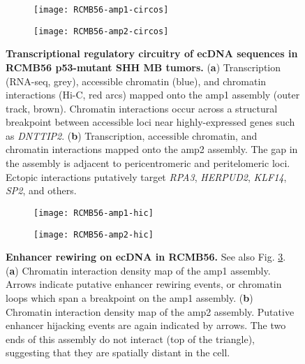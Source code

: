 \begin{figure}[!h]
    \centering
    \begin{subfigure}{.49\textwidth}
        \centering
        \texttt{[image: RCMB56-amp1-circos]}
        \caption{}
        \label{subfig:amp1-circos}
    \end{subfigure}
    \begin{subfigure}{.49\textwidth}
        \centering
        \texttt{[image: RCMB56-amp2-circos]}
        \caption{}
        \label{subfig:amp2-circos}
    \end{subfigure}
    \caption[Transcriptional regulatory circuitry of ecDNA sequences in RCMB56 p53-mutant SHH MB tumors.]{\textbf{Transcriptional regulatory circuitry of ecDNA sequences in RCMB56 p53-mutant SHH MB tumors.} (\textbf{a}) Transcription (RNA-seq, grey), accessible chromatin (blue), and chromatin interactions (Hi-C, red arcs) mapped onto the amp1 assembly (outer track, brown). Chromatin interactions occur across a structural breakpoint between accessible loci near highly-expressed genes such as \textit{DNTTIP2}. (\textbf{b}) Transcription, accessible chromatin, and chromatin interactions mapped onto the amp2 assembly. The gap in the assembly is adjacent to pericentromeric and peritelomeric loci. Ectopic interactions putatively target \textit{RPA3}, \textit{HERPUD2}, \textit{KLF14}, \textit{SP2}, and others.}
    \label{fig:RCMB56-circos}
\end{figure}
\begin{figure}
    \begin{subfigure}{\textwidth}
        \centering
        \texttt{[image: RCMB56-amp1-hic]}
        \caption{}
        \label{subfig:amp1-hic}
    \end{subfigure}
    \begin{subfigure}{\textwidth}
        \centering
        \texttt{[image: RCMB56-amp2-hic]}
        \caption{}
        \label{subfig:amp2-hic}
    \end{subfigure}
    \caption[Ectopic chromatin interactions on ecDNA in RCMB56.]{\textbf{Enhancer rewiring on ecDNA in RCMB56.} See also Fig. \ref{fig:RCMB56-circos}. (\textbf{a}) Chromatin interaction density map of the amp1 assembly. Arrows indicate putative enhancer rewiring events, or chromatin loops which span a breakpoint on the amp1 assembly. (\textbf{b}) Chromatin interaction density map of the amp2 assembly. Putative enhancer hijacking events are again indicated by arrows. The two ends of this assembly do not interact (top of the triangle), suggesting that they are spatially distant in the cell.}
    \label{fig:RCMB56-hic}
\end{figure}

